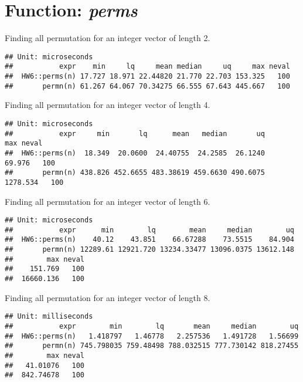 \documentclass[pdftex,12pt]{article}\usepackage[]{graphicx}\usepackage[]{color}
\makeatletter
\newenvironment{kframe}{%
 \def\at@end@of@kframe{}%
 \ifinner\ifhmode%
  \def\at@end@of@kframe{\end{minipage}}%
  \begin{minipage}{\columnwidth}%
 \fi\fi%
 \def\FrameCommand##1{\hskip\@totalleftmargin \hskip-\fboxsep
 \colorbox{shadecolor}{##1}\hskip-\fboxsep
     \hskip-\linewidth \hskip-\@totalleftmargin \hskip\columnwidth}%
 \MakeFramed {\advance\hsize-\width
   \@totalleftmargin\z@ \linewidth\hsize
   \@setminipage}}%
 {\par\unskip\endMakeFramed%
 \at@end@of@kframe}
\newenvironment{knitrout}{}{} %
\makeatother
\begin{document}
\section{Function: \emph{perms}}
Finding all permutation for an integer vector of length 2.
\begin{knitrout}
\color{fgcolor}\begin{kframe}
\begin{verbatim}
## Unit: microseconds
##           expr    min     lq     mean median     uq     max neval
##  HW6::perms(n) 17.727 18.971 22.44820 21.770 22.703 153.325   100
##       permn(n) 61.267 64.067 70.34275 66.555 67.643 445.667   100
\end{verbatim}
\end{kframe}
\end{knitrout}
Finding all permutation for an integer vector of length 4.
\begin{knitrout}
\color{fgcolor}\begin{kframe}
\begin{verbatim}
## Unit: microseconds
##           expr     min       lq      mean   median       uq      max neval
##  HW6::perms(n)  18.349  20.0600  24.40755  24.2585  26.1240   69.976   100
##       permn(n) 438.826 452.6655 483.38619 459.6630 490.6075 1278.534   100
\end{verbatim}
\end{kframe}
\end{knitrout}
Finding all permutation for an integer vector of length 6.
\begin{knitrout}
\color{fgcolor}\begin{kframe}
\begin{verbatim}
## Unit: microseconds
##           expr      min        lq        mean     median        uq
##  HW6::perms(n)    40.12    43.851    66.67288    73.5515    84.904
##       permn(n) 12289.61 12921.720 13234.33477 13096.0375 13612.148
##        max neval
##    151.769   100
##  16660.136   100
\end{verbatim}
\end{kframe}
\end{knitrout}
Finding all permutation for an integer vector of length 8.
\begin{knitrout}
\color{fgcolor}\begin{kframe}
\begin{verbatim}
## Unit: milliseconds
##           expr        min        lq       mean     median        uq
##  HW6::perms(n)   1.418797   1.46778   2.257536   1.491728   1.56699
##       permn(n) 745.798035 759.48498 788.032515 777.730142 818.27455
##        max neval
##   41.01076   100
##  842.74678   100
\end{verbatim}
\end{kframe}
\end{knitrout}
\newpage
\end{document}
